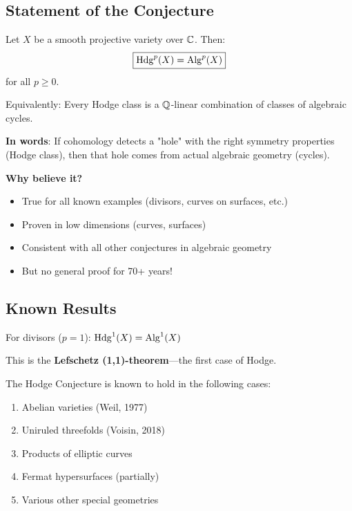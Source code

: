 \subsection{Statement of the Conjecture}

\begin{conjecture}\label{conj:hodge}
Let $X$ be a smooth projective variety over $\mathbb{C}$. Then:
\begin{equation}
\boxed{\operatorname{Hdg}^p(X) = \operatorname{Alg}^p(X)}
\end{equation}
for all $p \geq 0$.

Equivalently: Every Hodge class is a $\mathbb{Q}$-linear combination of classes of algebraic cycles.
\end{conjecture}

\begin{intuitive}
\textbf{In words}: If cohomology detects a "hole" with the right symmetry properties (Hodge class), then that hole comes from actual algebraic geometry (cycles).

\textbf{Why believe it?}
\begin{itemize}
\item True for all known examples (divisors, curves on surfaces, etc.)
\item Proven in low dimensions (curves, surfaces)
\item Consistent with all other conjectures in algebraic geometry
\item But no general proof for 70+ years!
\end{itemize}
\end{intuitive}

\subsection{Known Results}

\begin{theorem}[Lefschetz (1924)]\label{thm:lefschetz}
For divisors ($p = 1$): $\operatorname{Hdg}^1(X) = \operatorname{Alg}^1(X)$

This is the \textbf{Lefschetz (1,1)-theorem}—the first case of Hodge.
\end{theorem}

\begin{theorem}\label{thm:known-cases}
The Hodge Conjecture is known to hold in the following cases:
\begin{enumerate}
\item Abelian varieties (Weil, 1977)
\item Uniruled threefolds (Voisin, 2018)
\item Products of elliptic curves
\item Fermat hypersurfaces (partially)
\item Various other special geometries
\end{enumerate}
\end{theorem}

